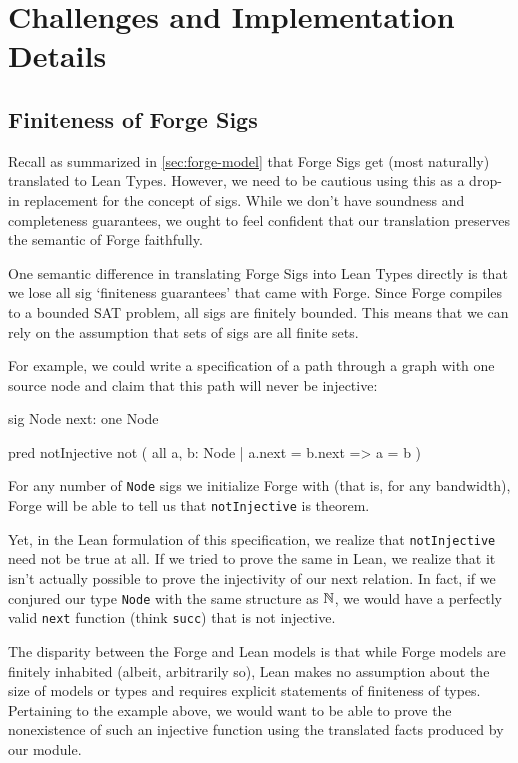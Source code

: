 \section{Challenges and Implementation Details}

\subsection{Finiteness of Forge Sigs}\label{sec:finiteness}
Recall as summarized in \cref{sec:forge-model} that Forge Sigs get (most naturally) translated to Lean Types. However, we need to be cautious using this as a drop-in replacement for the concept of sigs. While we don't have soundness and completeness guarantees, we ought to feel confident that our translation preserves the semantic of Forge faithfully. 

One semantic difference in translating Forge Sigs into Lean Types directly is that we lose all sig `finiteness guarantees' that came with Forge. Since Forge compiles to a bounded SAT problem, all sigs are finitely bounded. This means that we can rely on the assumption that sets of sigs are all finite sets. 

For example, we could write a specification of a path through a graph with one source node and claim that this path will never be injective:
\begin{forge*}
sig Node {
  next: one Node
}

pred notInjective {
  not ( all a, b: Node | 
    a.next = b.next => a = b )
}
\end{forge*}
For any number of \texttt{Node} sigs we initialize Forge with (that is, for any bandwidth), Forge will be able to tell us that \texttt{notInjective} is theorem. 

Yet, in the Lean formulation of this specification, we realize that \texttt{notInjective} need not be true at all. If we tried to prove the same in Lean, we realize that it isn't actually possible to prove the injectivity of our next relation. In fact, if we conjured our type \texttt{Node} with the same structure as $\mathbb N$, we would have a perfectly valid \texttt{next} function (think \texttt{succ}) that is not injective. 

The disparity between the Forge and Lean models is that while Forge models are finitely inhabited (albeit, arbitrarily so), Lean makes no assumption about the size of models or types and requires explicit statements of finiteness of types. Pertaining to the example above, we would want to be able to prove the nonexistence of such an injective function using the translated facts produced by our module. 

